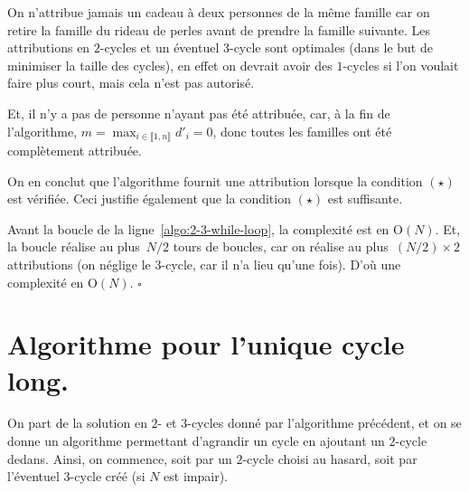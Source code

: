 \documentclass{../../notes}
\begin{document}
  On n'attribue jamais un cadeau à deux personnes de la même famille car on retire la famille du rideau de perles avant de prendre la famille suivante.
  Les attributions en $2$-cycles et un éventuel $3$-cycle sont optimales (dans le but de minimiser la taille des cycles), en effet on devrait avoir des $1$-cycles si l'on voulait faire plus court, mais cela n'est pas autorisé.

  Et, il n'y a pas de personne n'ayant pas été attribuée, car, à la fin de l'algorithme, $m = \max_{i \in \llbracket 1,n\rrbracket  } d'_i = 0$, donc toutes les familles ont été complètement attribuée.

  On en conclut que l'algorithme fournit une attribution lorsque la condition $(\star)$ est vérifiée.
  Ceci justifie également que la condition $(\star)$ est suffisante.

  Avant la boucle de la ligne~\ref{algo:2-3-while-loop}, la complexité est en $\mathrm{O}(N)$.
  Et, la boucle réalise au plus~$N / 2$ tours de boucles, car on réalise au plus~$(N / 2) \times 2$ attributions (on néglige le $3$-cycle, car il n'a lieu qu'une fois).
  D'où une complexité en $\mathrm{O}(N)$.
  \hfill $\square$

  \chapter{Algorithme pour l'unique cycle long.}

  On part de la solution en $2$- et $3$-cycles donné par l'algorithme précédent, et on se donne un algorithme permettant d'agrandir un cycle en ajoutant un $2$-cycle dedans.
  Ainsi, on commence, soit par un $2$-cycle choisi au hasard, soit par l'éventuel $3$-cycle créé (si $N$ est impair).
\end{document}
